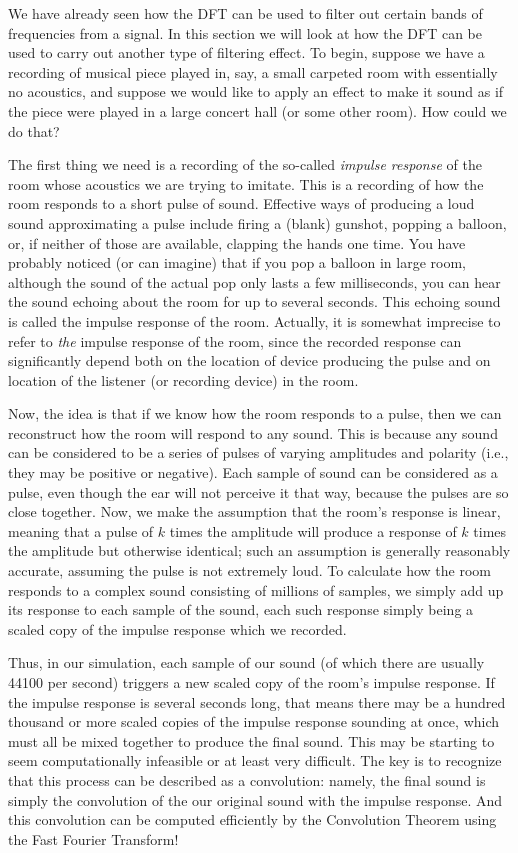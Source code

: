 We have already seen how the DFT can be used to filter out certain bands of frequencies from a signal. In this section we will look at how the DFT can be used to carry out another type of filtering effect. To begin, suppose we have a recording of musical piece played in, say, a small carpeted room with essentially no acoustics, and suppose we would like to apply an effect to make it sound as if the piece were played in a large concert hall (or some other room). How could we do that?

The first thing we need is a recording of the so-called \emph{impulse response} of the room whose acoustics we are trying to imitate. This is a recording of how the room responds to a short pulse of sound. Effective ways of producing a loud sound approximating a pulse include firing a (blank) gunshot, popping a balloon, or, if neither of those are available, clapping the hands one time. You have probably noticed (or can imagine) that if you pop a balloon in large room, although the sound of the actual pop only lasts a few milliseconds, you can hear the sound echoing about the room for up to several seconds. This echoing sound is called the impulse response of the room. Actually, it is somewhat imprecise to refer to \emph{the} impulse response of the room, since the recorded response can significantly depend both on the location of device producing the pulse and on location of the listener (or recording device) in the room.

Now, the idea is that if we know how the room responds to a pulse, then we can reconstruct how the room will respond to any sound. This is because any sound can be considered to be a series of pulses of varying amplitudes and polarity (i.e., they may be positive or negative). Each sample of sound can be considered as a pulse, even though the ear will not perceive it that way, because the pulses are so close together. Now, we make the assumption that the room's response is linear, meaning that a pulse of $k$ times the amplitude will produce a response of $k$ times the amplitude but otherwise identical; such an assumption is generally reasonably accurate, assuming the pulse is not extremely loud. To calculate how the room responds to a complex sound consisting of millions of samples, we simply add up its response to each sample of the sound, each such response simply being a scaled copy of the impulse response which we recorded.

Thus, in our simulation, each sample of our sound (of which there are usually 44100 per second) triggers a new scaled copy of the room's impulse response. If the impulse response is several seconds long, that means there may be a hundred thousand or more scaled copies of the impulse response sounding at once, which must all be mixed together to produce the final sound. This may be starting to seem computationally infeasible or at least very difficult. The key is to recognize that this process can be described as a convolution: namely, the final sound is simply the convolution of the our original sound with the impulse response. And this convolution can be computed efficiently by the Convolution Theorem using the Fast Fourier Transform!

